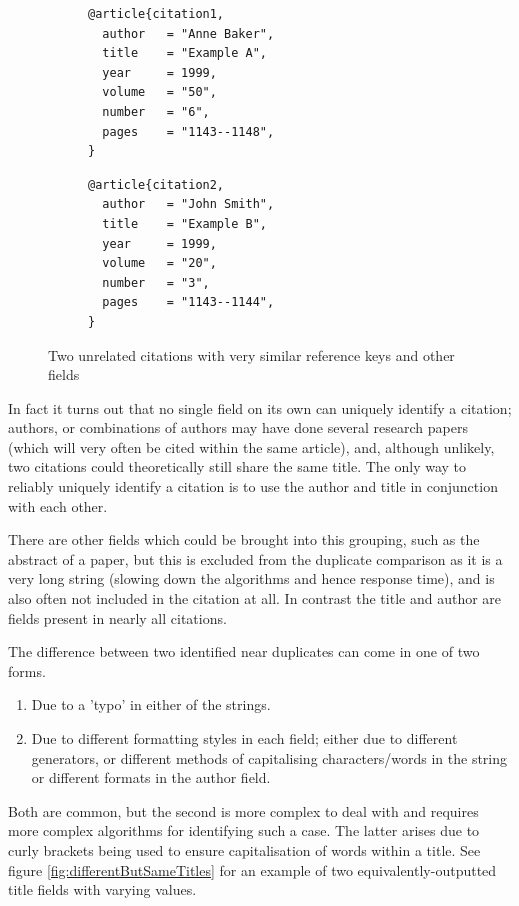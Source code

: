 \documentclass[a4paper,11pt]{article}
\begin{document}
\begin{figure}
\centering
\begin{subfigure}{.5\textwidth}
  \begin{verbatim}
@article{citation1,
  author   = "Anne Baker",
  title    = "Example A",
  year     = 1999,
  volume   = "50",
  number   = "6",
  pages    = "1143--1148",
}
\end{verbatim}
\end{subfigure}%
\begin{subfigure}{.5\textwidth}
  \begin{verbatim}
@article{citation2,
  author   = "John Smith",
  title    = "Example B",
  year     = 1999,
  volume   = "20",
  number   = "3",
  pages    = "1143--1144",
}
\end{verbatim}
\end{subfigure}
\caption{Two unrelated citations with very similar reference keys and other fields}
\label{fig:similarReferenceKeys}
\end{figure}

In fact it turns out that no single field on its own can uniquely identify a citation; authors, or combinations of authors may have done several research papers (which will very often be cited within the same article), and, although unlikely, two citations could theoretically still share the same title. The only way to reliably uniquely identify a citation is to use the author and title in conjunction with each other.

There are other fields which could be brought into this grouping, such as the abstract of a paper, but this is excluded from the duplicate comparison as it is a very long string (slowing down the algorithms and hence response time), and is also often not included in the citation at all. In contrast the title and author are fields present in nearly all citations.

The difference between two identified near duplicates can come in one of two forms.
\begin{enumerate}
    \item Due to a 'typo' in either of the strings.
    \item Due to different formatting styles in each field; either due to different generators, or different methods of capitalising characters/words in the string or different formats in the author field.
\end{enumerate}
Both are common, but the second is more complex to deal with and requires more complex algorithms for identifying such a case. The latter arises due to curly brackets being used to ensure capitalisation of words within a title. See figure \ref{fig:differentButSameTitles} for an example of two equivalently-outputted title fields with varying values.
\end{document}
